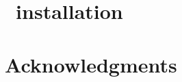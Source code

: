 
\begin{appendix}

\chapter{\GLOBES\ installation}
\label{app:installation}





\chapter*{Acknowledgments}

\end{appendix}
